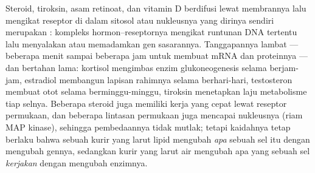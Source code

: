 \begin{proposition}\label{prop:b2:cell-signalling:nuclear}
Steroid, tiroksin, asam retinoat, dan vitamin D berdifusi lewat
membrannya lalu mengikat reseptor di dalam sitosol atau nukleusnya yang
dirinya sendiri merupakan \emph{}: kompleks
hormon--reseptornya mengikat runtunan DNA tertentu lalu menyalakan atau
memadamkan gen sasarannya. Tanggapannya lambat --- beberapa menit
sampai beberapa jam untuk membuat mRNA dan proteinnya --- dan bertahan
lama: kortisol mengimbas enzim glukoneogenesis selama berjam-jam,
estradiol membangun lapisan rahimnya selama berhari-hari, testosteron
membuat otot selama berminggu-minggu, tiroksin menetapkan laju
metabolisme tiap selnya. Beberapa steroid juga memiliki kerja yang
cepat lewat reseptor permukaan, dan beberapa lintasan permukaan juga
mencapai nukleusnya (riam MAP kinase), sehingga pembedaannya tidak
mutlak; tetapi kaidahnya tetap berlaku bahwa sebuah kurir yang larut
lipid mengubah \emph{apa} sebuah sel itu dengan mengubah gennya,
sedangkan kurir yang larut air mengubah apa yang sebuah sel
\emph{kerjakan} dengan mengubah enzimnya.
\end{proposition}

